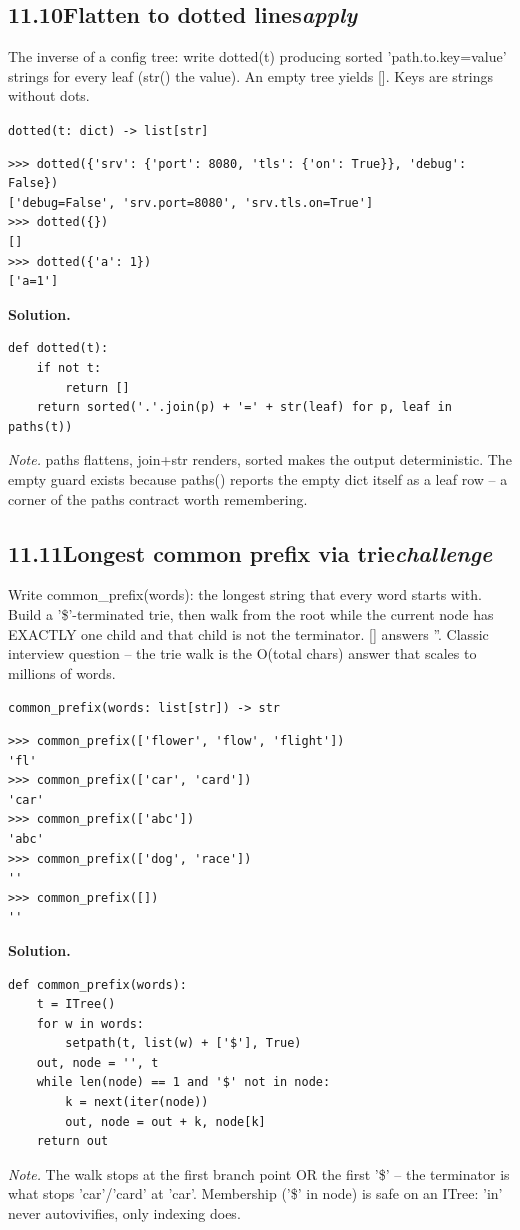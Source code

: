 \documentclass[10pt,letterpaper]{book}
\begin{document}
\subsection*{11.10\quad Flatten to dotted lines\hfill\textnormal{\textit{apply}}}
The inverse of a config tree: write dotted(t) producing sorted 'path.to.key=value' strings for every leaf (str() the value). An empty tree yields []. Keys are strings without dots.

\noindent\texttt{dotted(t: dict) -> list[str]}
\begin{lstlisting}[style=ex]
>>> dotted({'srv': {'port': 8080, 'tls': {'on': True}}, 'debug': False})
['debug=False', 'srv.port=8080', 'srv.tls.on=True']
>>> dotted({})
[]
>>> dotted({'a': 1})
['a=1']
\end{lstlisting}
\noindent\textbf{Solution.}
\begin{lstlisting}[style=code]
def dotted(t):
    if not t:
        return []
    return sorted('.'.join(p) + '=' + str(leaf) for p, leaf in paths(t))
\end{lstlisting}
\noindent\textit{Note.} paths flattens, join+str renders, sorted makes the output deterministic. The empty guard exists because paths({}) reports the empty dict itself as a leaf row -- a corner of the paths contract worth remembering.


\subsection*{11.11\quad Longest common prefix via trie\hfill\textnormal{\textit{challenge}}}
Write common\_prefix(words): the longest string that every word starts with. Build a '\$'-terminated trie, then walk from the root while the current node has EXACTLY one child and that child is not the terminator. [] answers ''. Classic interview question -- the trie walk is the O(total chars) answer that scales to millions of words.

\noindent\texttt{common\_prefix(words: list[str]) -> str}
\begin{lstlisting}[style=ex]
>>> common_prefix(['flower', 'flow', 'flight'])
'fl'
>>> common_prefix(['car', 'card'])
'car'
>>> common_prefix(['abc'])
'abc'
>>> common_prefix(['dog', 'race'])
''
>>> common_prefix([])
''
\end{lstlisting}
\noindent\textbf{Solution.}
\begin{lstlisting}[style=code]
def common_prefix(words):
    t = ITree()
    for w in words:
        setpath(t, list(w) + ['$'], True)
    out, node = '', t
    while len(node) == 1 and '$' not in node:
        k = next(iter(node))
        out, node = out + k, node[k]
    return out
\end{lstlisting}
\noindent\textit{Note.} The walk stops at the first branch point OR the first '\$' -- the terminator is what stops 'car'/'card' at 'car'. Membership ('\$' in node) is safe on an ITree: 'in' never autovivifies, only indexing does.
\end{document}
